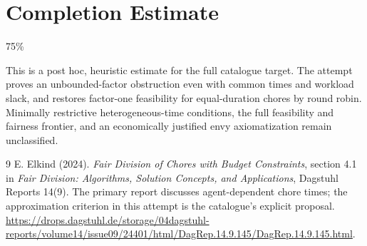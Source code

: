 \documentclass[11pt,a4paper]{article}
\begin{document}
\section{Completion Estimate}
75\%

This is a post hoc, heuristic estimate for the full catalogue target.
The attempt proves an unbounded-factor obstruction even with common times and workload slack, and restores factor-one feasibility for equal-duration chores by round robin. Minimally restrictive heterogeneous-time conditions, the full feasibility and fairness frontier, and an economically justified envy axiomatization remain unclassified.

\begin{thebibliography}{9}
 E. Elkind (2024). \emph{Fair Division of Chores with Budget Constraints}, section 4.1 in \emph{Fair Division: Algorithms, Solution Concepts, and Applications}, Dagstuhl Reports 14(9).
The primary report discusses agent-dependent chore times; the approximation criterion in this attempt is the catalogue's explicit proposal.
\url{https://drops.dagstuhl.de/storage/04dagstuhl-reports/volume14/issue09/24401/html/DagRep.14.9.145/DagRep.14.9.145.html}.
\end{thebibliography}
\end{document}
